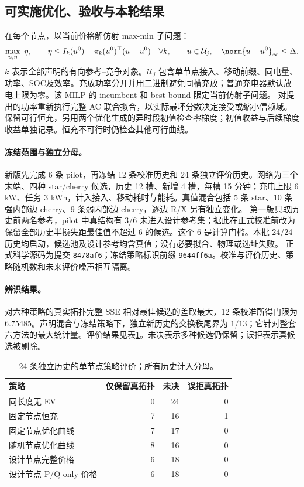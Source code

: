 \subsection{可实施优化、验收与本轮结果}
在每个节点，以当前价格解仿射 max-min 子问题：
\begin{equation}
\max_{u,\eta}\ \eta,\qquad
\eta\le I_k(u^0)+\pi_k(u^0)^\top(u-u^0)\quad\forall k,
\qquad u\in\mathcal U_j,\quad\norm{u-u^0}_\infty\le\Delta.
\label{eq:gp-master}
\end{equation}
$k$ 表示全部声明的有向参考--竞争对象。$\mathcal U_j$ 包含单节点接入、移动前缀、同电量、功率、SOC及效率。充放功率分开并用二进制避免同槽充放；普通充电器默认放电上限为零。该 MILP 的 incumbent 和 best-bound 限定当前仿射子问题。
对提出的功率重新执行完整 AC 联合拟合，以实际最坏分数决定接受或缩小信赖域。保留可行恒充，另用两个优化生成的异时段初值检查零梯度；初值收益与后续梯度收益单独记录。恒充不可行时仍检查其他可行曲线。

\paragraph{冻结范围与独立分母。}
新版先完成 6 条 pilot，再冻结 12 条校准历史和 24 条独立评价历史。网络为三个末端、四种 star/cherry 候选，历史 12 槽、新增 4 槽，每槽 15 分钟；充电上限 6 kW、任务 3 kWh，计入接入、移动耗时与能耗。真值混合包括 5 条 star、10 条强内部边 cherry、9 条弱内部边 cherry，逐边 R/X 另有独立变化。
第一版只取历史前两名参考，pilot 中真结构有 3/6 未进入设计参考集；据此在正式校准前改为保留全部历史半损失距最佳值不超过 6 的候选。这个 6 是计算门槛。本批 24/24 历史均启动，候选池及设计参考均含真值；没有必要拟合、物理或选址失败。
正式科学源码为提交 \texttt{8478af6}；冻结策略标识前缀 \texttt{9644ff6a}。校准与评价历史、策略随机数和未来评价噪声相互隔离。

\paragraph{辨识结果。}
对六种策略的真实拓扑完整 SSE 相对最佳候选的差取最大，12 条校准所得门限为 6.75485。声明混合与冻结策略下，独立新历史的交换秩尾界为 $1/13$；它针对整套六方法的最大统计量。评价结果见表\ref{tab:gp-result}。未决表示多种候选仍保留；误拒表示真候选被剔除。

\begin{table}[htbp]\centering\small
\caption{24 条独立历史的单节点策略评价；所有历史计入分母。}
\label{tab:gp-result}
\begin{tabular}{lrrr}\toprule
策略 & 仅保留真拓扑 & 未决 & 误拒真拓扑\\\midrule
同长度无 EV & 0 & 24 & 0\\
固定节点恒充 & 7 & 16 & 1\\
固定节点优化曲线 & 7 & 17 & 0\\
随机节点优化曲线 & 8 & 16 & 0\\
设计节点完整价格 & 6 & 18 & 0\\
设计节点 P/Q-only 价格 & 6 & 18 & 0\\\bottomrule
\end{tabular}
\end{table}

